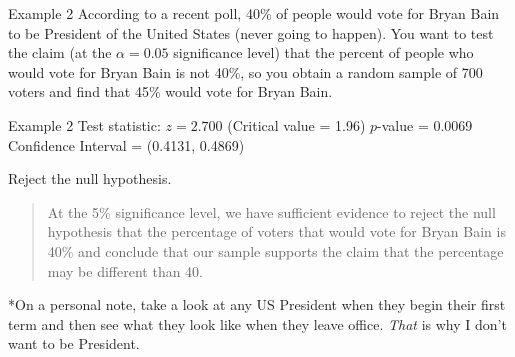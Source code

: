 \documentclass[t]{beamer}
\begin{document}
\begin{frame}{Example 2}
According to a recent poll, 40\% of people would vote for Bryan Bain to be President of the United States (never going to happen). You want to test the claim (at the $\alpha = 0.05$ significance level) that the percent of people who would vote for Bryan Bain is not 40\%, so you obtain a random sample of 700 voters and find that 45\% would vote for Bryan Bain.	\newline\\

 \newline
{}
\end{frame}

\begin{frame}{Example 2}
Test statistic: $z = 2.700$ (Critical value = 1.96)	\newline
$p$-value = 0.0069	\newline
Confidence Interval = (0.4131, 0.4869) \newline\\	\pause

Reject the null hypothesis.	\newline\\	\pause

\begin{quote}
At the 5\% significance level, we have sufficient evidence to reject the null hypothesis that the percentage of voters that would vote for Bryan Bain is 40\% and conclude that our sample supports the claim that the percentage may be different than 40.
\end{quote}
\pause

*On a personal note, take a look at any US President when they begin their first term and then see what they look like when they leave office. \emph{That} is why I don't want to be President.
\end{frame}
\end{document}
